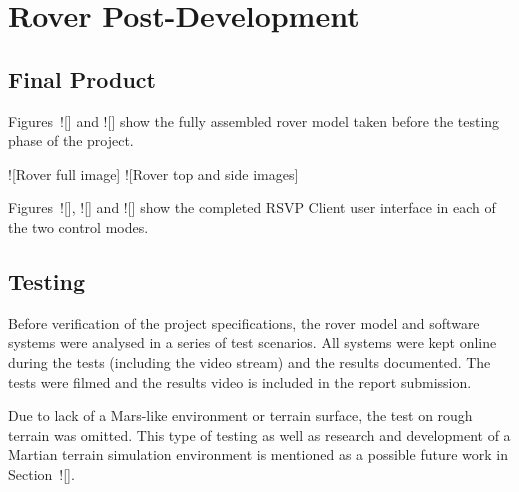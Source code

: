 \chapter{Rover Post-Development}
  \section{Final Product}
    Figures~![] and ![] show the fully assembled rover model taken before the testing phase of the project.
    
    ![Rover full image]
    ![Rover top and side images]
    
    Figures~![], ![] and ![] show the completed RSVP Client user interface in each of the two control modes.
  
  \section{Testing}
    Before verification of the project specifications, the rover model and software systems were analysed in a series of test scenarios. All systems were kept online during the tests (including the video stream) and the results documented. The tests were filmed and the results video is included in the report submission.
    
    Due to lack of a Mars-like environment or terrain surface, the test on rough terrain was omitted. This type of testing as well as research and development of a Martian terrain simulation environment is mentioned as a possible future work in Section~![].
    
